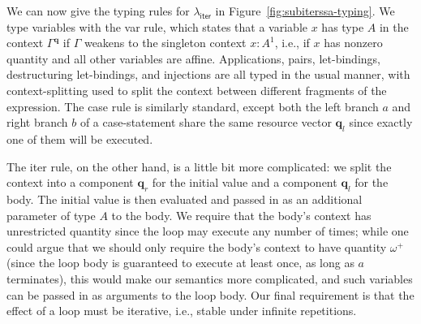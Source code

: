 \documentclass[acmsmall,screen,review]{acmart}
\newcommand{\mb}[1]{\ensuremath{\mathbf{#1}}}
\newcommand{\ms}[1]{\ensuremath{\mathsf{#1}}}
\newcommand{\brle}[1]{{\textsf{#1}}}
\newcommand{\subiterssa}{\(\lambda_{\ms{iter}}\)}
\newcommand{\oneq}{1}
\newcommand{\cpyq}{\omega^+}
\begin{document}
We can now give the typing rules for \subiterssa{} in Figure~\ref{fig:subiterssa-typing}. We type
variables with the \brle{var} rule, which states that a variable $x$ has type $A$ in the context
$\Gamma^{\mb{q}}$ if $\Gamma$ weakens to the singleton context $x: A^\oneq$, i.e., if $x$ has
nonzero quantity and all other variables are affine. Applications, pairs, let-bindings,
destructuring let-bindings, and injections are all typed in the usual manner, with context-splitting
used to split the context between different fragments of the expression. The \brle{case} rule is
similarly standard, except both the left branch $a$ and right branch $b$ of a case-statement share
the same resource vector $\mb{q}_l$ since exactly one of them will be executed.

The \brle{iter} rule, on the other hand, is a little bit more complicated: we split the context into
a component $\mb{q}_r$ for the initial value and a component $\mb{q}_l$ for the body. The initial
value is then evaluated and passed in as an additional parameter of type $A$ to the body. We require
that the body's context has unrestricted quantity since the loop may execute any number of times;
while one could argue that we should only require the body's context to have quantity $\cpyq$ (since
the loop body is guaranteed to execute at least once, as long as $a$ terminates), this would make
our semantics more complicated, and such variables can be passed in as arguments to the loop body.
Our final requirement is that the effect of a loop must be iterative, i.e., stable under infinite
repetitions.
\end{document}
